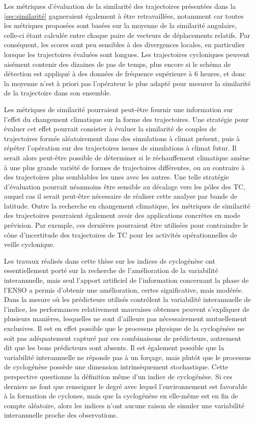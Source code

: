 \documentclass[../main.tex]{subfiles}
\begin{document}
Les métriques d'évaluation de la similarité des trajectoires présentées dans la \cref{sec:similarité} gagneraient également à être retravaillées, notamment car
toutes les métriques proposées sont basées sur la moyenne de la similarité angulaire, celle-ci étant calculée entre chaque paire de vecteurs de déplacements
relatifs. Par conséquent, les scores sont peu sensibles à des divergences locales, en particulier lorsque les trajectoires évaluées sont longues. Les
trajectoires cycloniques peuvent aisément contenir des dizaines de pas de temps, plus encore si le schéma de détection est appliqué à des données de
fréquence supérieure à \num{6} heures, et donc la moyenne n'est à priori pas l'opérateur le plus adapté pour mesurer la similarité de la trajectoire dans son
ensemble.

Les métriques de similarité pourraient peut-être fournir une information sur l'effet du changement climatique sur la forme des trajectoires. Une stratégie pour
évaluer cet effet pourrait consister à évaluer la similarité de couples de trajectoires formés aléatoirement dans des simulations à climat présent, puis à
répéter l'opération sur des trajectoires issues de simulations à climat futur. Il serait alors peut-être possible de déterminer si le réchauffement climatique
amène à une plus grande variété de formes de trajectoires différentes, ou au contraire à des trajectoires plus semblables les unes avec les autres. Une telle
stratégie d'évaluation pourrait néanmoins être sensible au décalage vers les pôles des TC, auquel cas il serait peut-être nécessaire de réaliser cette analyse
par bande de latitude. Outre la recherche en changement climatique, les métriques de similarité des trajectoires pourraient également avoir des applications
concrètes en mode prévision. Par exemple, ces dernières pourraient être utilisées pour contraindre le cône d'incertitude des trajectoires de TC pour les
activités opérationnelles de veille cyclonique.

Les travaux réalisés dans cette thèse sur les indices de cyclogénèse ont essentiellement porté sur la recherche de l'amélioration de la variabilité
interannuelle, mais seul l'apport artificiel de l'information concernant la phase de l'ENSO a permis d'obtenir une amélioration, certes significative, mais
modérée. Dans la mesure où les prédicteurs utilisés contrôlent la variabilité interannuelle de l'indice, les performances relativement mauvaises obtenues
peuvent s'expliquer de plusieurs manières, lesquelles ne sont d'ailleurs pas nécessairement mutuellement exclusives. Il est en effet possible que le processus
physique de la cyclogénèse ne soit pas adéquatement capturé par ces combinaisons de prédicteurs, autrement dit que les bons prédicteurs sont absents. Il est
également possible que la variabilité interannuelle ne réponde pas à un forçage, mais plutôt que le processus de cyclogénèse possède une dimension
intrinsèquement stochastique. Cette perspective questionne la définition même d'un indice de cyclogénèse. Si ces derniers ne font que renseigner le degré avec
lequel l'environnement est favorable à la formation de cyclones, mais que la cyclogénèse en elle-même est en fin de compte aléatoire, alors les indices n'ont
aucune raison de simuler une variabilité interannuelle proche des observations.
\end{document}
